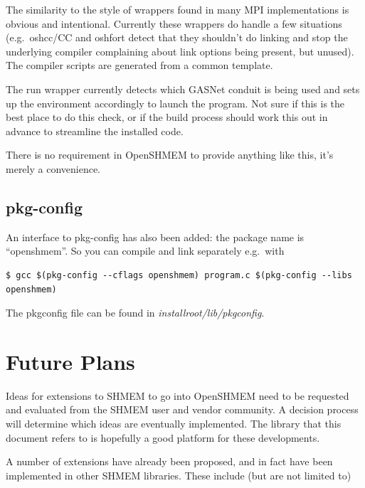 \documentclass[english]{article}
\begin{document}
The similarity to the style of wrappers found in many MPI
implementations is obvious and intentional. Currently these wrappers
do handle a few situations (e.g.\ oshcc/CC and oshfort detect that they
shouldn't do linking and stop the underlying compiler complaining
about link options being present, but unused). The compiler scripts
are generated from a common template.

The run wrapper currently detects which GASNet conduit is being used
and sets up the environment accordingly to launch the program. Not
sure if this is the best place to do this check, or if the build
process should work this out in advance to streamline the installed
code.

There is no requirement in OpenSHMEM to provide anything like this,
it's merely a convenience.

\subsection{pkg-config}

An interface to pkg-config has also been added: the package name is ``openshmem''.  So you can compile and link separately e.g.\ with

\begin{lstlisting}
$ gcc $(pkg-config --cflags openshmem) program.c $(pkg-config --libs openshmem)
\end{lstlisting}

The pkgconfig file can be found in \emph{installroot/lib/pkgconfig}.

\section{Future Plans}

Ideas for extensions to SHMEM to go into OpenSHMEM need to be
requested and evaluated from the SHMEM user and vendor community. A
decision process will determine which ideas are eventually
implemented. The library that this document refers to is hopefully a
good platform for these developments.

A number of extensions have already been proposed, and in fact have
been implemented in other SHMEM libraries. These include (but are not
limited to)
\end{document}

